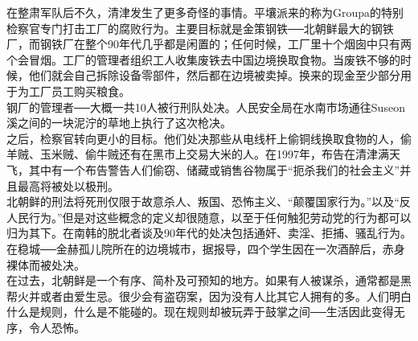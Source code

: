 在整肃军队后不久，清津发生了更多奇怪的事情。平壤派来的称为Groupa的特别检察官专门打击工厂的腐败行为。主要目标就是金策钢铁──北朝鲜最大的钢铁厂，而钢铁厂在整个90年代几乎都是闲置的；任何时候，工厂里十个烟囱中只有两个会冒烟。工厂的管理者组织工人收集废铁去中国边境换取食物。当废铁不够的时候，他们就会自己拆除设备零部件，然后都在边境被卖掉。换来的现金至少部分用于为工厂员工购买粮食。\\

钢厂的管理者──大概一共10人被行刑队处决。人民安全局在水南市场通往Suseon溪之间的一块泥泞的草地上执行了这次枪决。\\

之后，检察官转向更小的目标。他们处决那些从电线杆上偷铜线换取食物的人，偷羊贼、玉米贼、偷牛贼还有在黑市上交易大米的人。在1997年，布告在清津满天飞，其中有一个布告警告人们偷窃、储藏或销售谷物属于“扼杀我们的社会主义”并且最高将被处以极刑。\\

北朝鲜的刑法将死刑仅限于故意杀人、叛国、恐怖主义、“颠覆国家行为。”以及“反人民行为。”但是对这些概念的定义却很随意，以至于任何触犯劳动党的行为都可以归为其下。在南韩的脱北者谈及90年代的处决包括通奸、卖淫、拒捕、骚乱行为。在稳城──金赫孤儿院所在的边境城市，据报导，四个学生因在一次酒醉后，赤身裸体而被处决。\\

在过去，北朝鲜是一个有序、简朴及可预知的地方。如果有人被谋杀，通常都是黑帮火并或者由爱生忌。很少会有盗窃案，因为没有人比其它人拥有的多。人们明白什么是规则，什么是不能碰的。现在规则却被玩弄于鼓掌之间──生活因此变得无序，令人恐怖。\\
